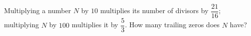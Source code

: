 Multiplying a number $N$ by $10$ multiplies its number of divisors by $\dfrac{21}{16}$; multiplying $N$ by $100$ multiplies it by $\dfrac53$. How many trailing zeros does $N$ have?
